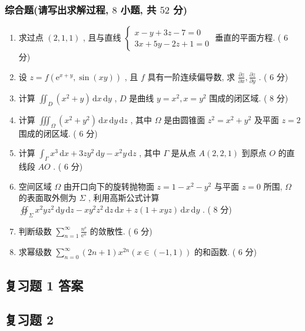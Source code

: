 \documentclass[cn,11pt,fancy,hide]{elegantbook}
\newcommand{\ee}{\mathrm{e}}
\newcommand{\dd}{\,\mathrm{d}}
\begin{document}
\subsubsection{综合题(请写出求解过程, $8$ 小题, 共 $52$ 分)}
\begin{enumerate}
	\item 求过点 $(2,1,1)$ , 且与直线 $\begin{cases}
	x-y+3 z-7=0\\
	3 x+5 y-2 z+1=0
	\end{cases}$ 垂直的平面方程. ( $6$ 分)
	
	\item 设 $z=f\left(\ee^{x+y}, \sin (x y)\right)$ , 且 $f$ 具有一阶连续偏导数, 求 $\frac{\partial z}{\partial x}, \frac{\partial z}{\partial y}$ . ( $6$ 分)
	
	\item 计算 $\iint_{D}\left(x^{2}+y\right) \dd x \dd y$ , $D$ 是曲线 $y=x^{2}, x=y^{2}$ 围成的闭区域. ( $8$ 分)
	
	\item 计算 $\iiint_{\Omega}\left(x^{2}+y^{2}\right) \dd x \dd y \dd z$ , 其中 $\Omega$ 是由圆锥面 $z^{2}=x^{2}+y^{2}$ 及平面 $z=2$ 围成的闭区域. ( $6$ 分)
	
	\item 计算 $\int_{\Gamma} x^{3} \dd x+3 z y^{2} \dd y-x^{2} y \dd z$ , 其中 $\Gamma$ 是从点 $A(2,2,1)$ 到原点 $O$ 的直线段 $AO$ . ( $6$ 分)
	
	\item 空间区域 $\Omega$ 由开口向下的旋转抛物面 $z=1-x^{2}-y^{2}$ 与平面 $z=0$ 所围, $\Omega$ 的表面取外侧为 $\Sigma$ , 利用高斯公式计算 $\oiint_{\Sigma} x^{2} y z^{2} \dd y \dd z-x y^{2} z^{2} \dd z \dd x+z(1+x y z) \dd x \dd y$ . ( $8$ 分)
	
	\item 判断级数 $\sum_{n=1}^{\infty} \frac{n^{\ee}}{\ee^{n}}$ 的敛散性. ( $6$ 分)
	
	\item 求幂级数 $\sum_{n=0}^{\infty}(2 n+1) x^{2 n}(x \in(-1,1))$ 的和函数. ( $6$ 分)
\end{enumerate}


\subsection{复习题 1 答案}

\subsection{复习题 2}
\end{document}
